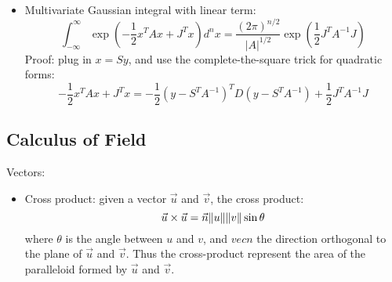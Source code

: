 \documentclass{report}
\begin{document}
\begin{itemize}
	\item Multivariate Gaussian integral with linear term: 
	\begin{equation}
	\int_{-\infty}^{\infty} \exp(-\frac{1}{2}x^T A x + J^T x) d^n x	= \frac{(2 \pi)^{n/2}}{|A|^{1/2}} \exp\left(\frac{1}{2} J^T A^{-1} J\right)
	\end{equation}
	Proof: plug in $x = Sy$, and use the complete-the-square trick for quadratic forms: 
	\begin{equation}
	-\frac{1}{2}x^T A x + J^T x = -\frac{1}{2} (y - S^T A^{-1})^T D (y - S^T A^{-1}) + \frac{1}{2} J^T A^{-1} J	
	\end{equation}
	
\end{itemize}

\subsection{Calculus of Field}

Vectors: 
\begin{itemize}
\item Cross product: given a vector $\vec{u}$ and $\vec{v}$, the cross product: 
\begin{equation}
\vec{u} \times \vec{u} = \vec{n} \lVert u\rVert \lVert v\rVert \sin \theta 
\end{equation}
where $\theta$ is the angle between $u$ and $v$, and $vec{n}$ the direction orthogonal to the plane of $\vec{u}$ and $\vec{v}$. Thus the cross-product represent the area of the paralleloid formed by $\vec{u}$ and $\vec{v}$. 
\end{itemize}
\end{document}

